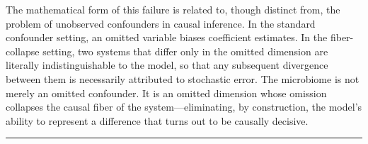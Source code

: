 \documentclass[11pt, a4paper]{article}
\begin{document}
The mathematical form of this failure is related to, though distinct from, the problem of unobserved confounders in causal inference. In the standard confounder setting, an omitted variable biases coefficient estimates. In the fiber-collapse setting, two systems that differ only in the omitted dimension are literally indistinguishable to the model, so that any subsequent divergence between them is necessarily attributed to stochastic error. The microbiome is not merely an omitted confounder. It is an omitted dimension whose omission collapses the causal fiber of the system---eliminating, by construction, the model's ability to represent a difference that turns out to be causally decisive.

\bigskip
\begin{center}
\textcolor{darkgray}{\rule{0.4\textwidth}{0.4pt}}
\end{center}

\end{document}
